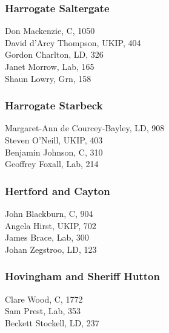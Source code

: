 \documentclass[a4paper,openany,10pt]{book}
\begin{document}
\subsubsection*{Harrogate Saltergate}



Don Mackenzie, C, 1050\\
David d'Arcy Thompson, UKIP, 404\\
Gordon Charlton, LD, 326\\
Janet Morrow, Lab, 165\\
Shaun Lowry, Grn, 158\\


\subsubsection*{Harrogate Starbeck}



{Margaret-Ann de Courcey-Bayley}, LD, 908\\
Steven O'Neill, UKIP, 403\\
Benjamin Johnson, C, 310\\
Geoffrey Foxall, Lab, 214\\


\subsubsection*{Hertford and Cayton}



John Blackburn, C, 904\\
Angela Hirst, UKIP, 702\\
James Brace, Lab, 300\\
Johan Zegstroo, LD, 123\\


\subsubsection*{Hovingham and Sheriff Hutton}



Clare Wood, C, 1772\\
Sam Prest, Lab, 353\\
Beckett Stockell, LD, 237\\
\end{document}
